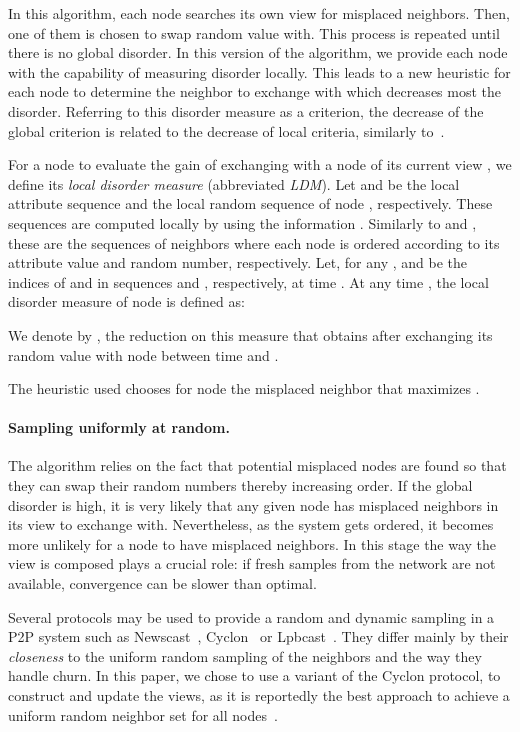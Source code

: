 \documentclass[times,10pt,twocolumn]{article}
\begin{document}
In this algorithm, each node  searches its own view 
 for misplaced neighbors. Then, 
one of them is chosen to swap  random value with. This process is repeated
until there is no global disorder.
In this version of the algorithm, we provide each node with  the capability
of measuring disorder locally. This leads to  a new
heuristic for each node to determine 
the neighbor to exchange with which decreases most the disorder.
Referring to this disorder measure as a criterion,
the decrease of the global criterion is related to the decrease of local 
criteria, similarly to~\cite{ADGR05}.


For a node  to evaluate the gain of exchanging with a node 
of its current view ,
we define its \emph{local disorder measure} (abbreviated \emph{LDM}).  Let  and 
 be the local attribute sequence and the local 
random sequence of node , respectively.   These sequences are computed locally by  
using the information .  Similarly to 
and , these are the sequences of neighbors where each node
is ordered according to its attribute value and random number, respectively.
Let, for any ,  and  be the 
indices of  and  in sequences  and
, respectively, at time .
At any time , the local disorder measure of node  is defined as:

We denote by , the reduction 
on this measure that  obtains after exchanging its random value with node 
 between time  and .

The heuristic used chooses for node  the misplaced neighbor  that
maximizes .
   
   
\paragraph{Sampling uniformly at random.}

The algorithm relies on the fact that potential misplaced nodes are found
so that they can swap their
random numbers thereby increasing order. 
If the global disorder is high,  it is very likely that
any given node has misplaced neighbors in its view to exchange with.
Nevertheless, as the system gets ordered, it becomes more unlikely for a node
 to have misplaced neighbors.
In this stage the way the view is composed plays a crucial role: if fresh
samples from the network are not available, convergence can be slower than
optimal.


Several protocols may be used to provide a random and dynamic sampling 
in a P2P system such as Newscast~\cite{JMB05}, Cyclon~\cite{VGS05} or Lpbcast~\cite{JGKS04}.
They differ mainly by their \textit{closeness}
to the uniform random sampling of the neighbors and the way they handle churn.
In this paper,
we chose to use a variant of the Cyclon
protocol, to construct and update the views, as it is reportedly
the best approach to achieve a uniform random neighbor set for all nodes~\cite{I05}.
\end{document}
